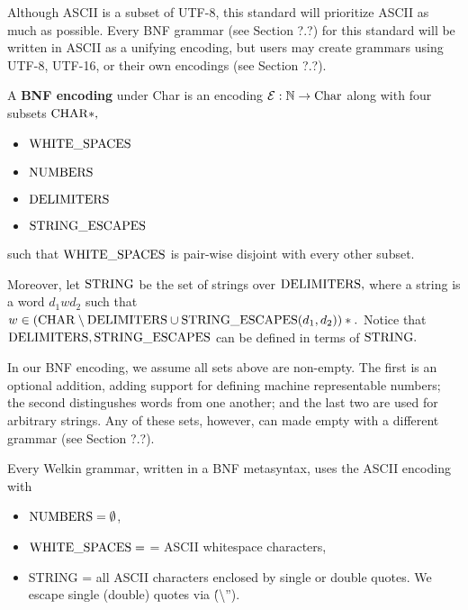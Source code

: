 Although ASCII is a subset of UTF-8, this standard will prioritize ASCII as much as possible. Every BNF grammar (see Section ?.?) for this standard will be written in ASCII as a unifying encoding, but users may create grammars using UTF-8, UTF-16, or their own encodings (see Section ?.?).


\begin{definition}
  A \textbf{BNF encoding} under Char is an encoding $\mathcal{E}: \mathbb{N} \to \textrm{Char}$ along with four subsets $\mathrm{CHAR}*,$
  \begin{itemize}
  \item $\mathrm{WHITE\_SPACES}$
  \item $\mathrm{NUMBERS}$
  \item $\mathrm{DELIMITERS}$
  \item $\mathrm{STRING\_ESCAPES}$
  \end{itemize}
  such that $\mathrm{WHITE\_SPACES}$ is pair-wise disjoint with every other subset.

Moreover, let $\mathrm{STRING}$ be the set of strings over $\mathrm{DELIMITERS},$ where a string is a word $d_{1}wd_{2}$ such that $w \in (\mathrm{CHAR} \setminus \mathrm{DELIMITERS} \cup \mathrm{STRING\_ESCAPES}(d_{1}, d_{2}))*.$ Notice that $\mathrm{DELIMITERS}, \mathrm{STRING\_ESCAPES}$ can be defined in terms of $\mathrm{STRING}.$
\end{definition}
In our BNF encoding, we assume all sets above are non-empty. The first is an optional addition, adding support for defining machine representable numbers; the second distingushes words from one another; and the last two are used for arbitrary strings. Any of these sets, however, can made empty with a different grammar (see Section ?.?).





Every Welkin grammar, written in a BNF metasyntax, uses the ASCII encoding with
\begin{itemize}
  \item $\mathrm{NUMBERS} = \emptyset$,
  \item $\mathrm{WHITE\_SPACES} = $ = ASCII whitespace characters,
  \item STRING = all ASCII characters enclosed by single or double quotes. We escape single (double) quotes via \' (\textbackslash'').
\end{itemize}

